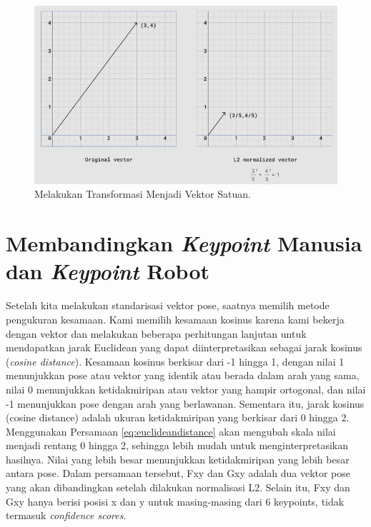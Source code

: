 \begin{figure}[ht]
  \centering
  \includegraphics[scale=0.65]{gambar/transform-to-unit-vector.png}
  \caption{Melakukan Transformasi Menjadi Vektor Satuan.}
  \label{fig:transforming-into-unit-vector}
\end{figure}

\section{Membandingkan \textit{Keypoint} Manusia dan \textit{Keypoint} Robot}
\label{sec:comparing-keypoints}

Setelah kita melakukan standarisasi vektor pose, saatnya memilih metode pengukuran kesamaan. Kami memilih kesamaan kosinus karena kami bekerja dengan vektor dan melakukan beberapa perhitungan lanjutan untuk mendapatkan jarak Euclidean yang dapat diinterpretasikan sebagai jarak kosinus (\textit{cosine distance}).
Kesamaan kosinus berkisar dari -1 hingga 1, dengan nilai 1 menunjukkan pose atau vektor yang identik atau berada dalam arah yang sama, nilai 0 menunjukkan ketidakmiripan atau vektor yang hampir ortogonal, dan nilai -1 menunjukkan pose dengan arah yang berlawanan. Sementara itu, jarak kosinus (cosine distance) adalah ukuran ketidakmiripan yang berkisar dari 0 hingga 2.
Menggunakan Persamaan \ref{eq:euclideandistance} akan mengubah skala nilai menjadi rentang 0 hingga 2, sehingga lebih mudah untuk menginterpretasikan hasilnya. Nilai yang lebih besar menunjukkan ketidakmiripan yang lebih besar antara pose. Dalam persamaan tersebut, Fxy dan Gxy adalah dua vektor pose yang akan dibandingkan setelah dilakukan normalisasi L2. Selain itu, Fxy dan Gxy hanya berisi posisi x dan y untuk masing-masing dari 6 keypoints, tidak termasuk \textit{confidence scores}.

